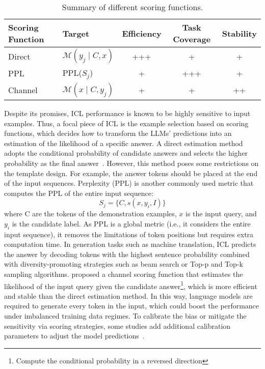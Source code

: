 \begin{table}[h!]
	\centering
	\small
	\begin{tabularx}{0.8\textwidth}{lXccc}
		\toprule
		\textbf{Scoring Function} & \textbf{Target}              & \textbf{Efficiency} & \textbf{Task Coverage} & \textbf{Stability} \\
		\midrule
		Direct                    & $\mathcal{M}(y_j \mid C, x)$ & +++                 & +                      & +                  \\
		PPL                       & PPL($S_j$)                   & +                   & +++                    & +                  \\
		Channel                   & $\mathcal{M}(x \mid C, y_j)$ & +                   & +                      & ++                 \\
		\bottomrule
	\end{tabularx}
	\caption{Summary of different scoring functions.}
	\label{tab:scoring-functions}
\end{table}

Despite its promises, ICL performance is known to be highly sensitive to input examples.
Thus, a focal piece of ICL is the example selection based on scoring functions, which decides how to transform the LLMs' predictions into an estimation of the likelihood of a specific answer.
A direct estimation method adopts the conditional probability of candidate answers and selects the higher probability as the final answer~\cite{brown2020language}.
However, this method poses some restrictions on the template design.
For example, the answer tokens should be placed at the end of the input sequences.
Perplexity (PPL) is another commonly used metric that computes the PPL of the entire input sequence:
\begin{equation}
	S_j = \{C,s(x,y_i,I)\}
	\label{eq:ppl}
\end{equation}
where C are the tokens of the demonstration examples, $x$ is the input query, and $y_i$ is the candidate label.
As PPL is a global metric (i.e., it considers the entire input sequence), it removes the limitations of token positions but requires extra computation time.
In generation tasks such as machine translation, ICL predicts the answer by decoding tokens with the highest sentence probability combined with diversity-promoting strategies such as beam search or Top-p and Top-k~\cite{holzman2020curious} sampling algorithms.
\textcite{min2022noisy} proposed a channel scoring function that estimates the likelihood of the input query given the candidate answer\footnote{Compute the conditional
	probability in a reversed direction}, which is more efficient and stable than the direct estimation method.
In this way, language models are required to generate every token in the input, which could boost the performance under imbalanced training data regimes.
To calibrate the bias or mitigate the sensitivity via scoring strategies, some studies add additional calibration parameters to adjust the model predictions~\cite{zhao2021calibrate}.

